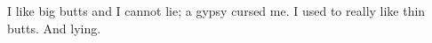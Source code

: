 \item I like big butts and I cannot lie; a gypsy cursed me. I used to
  really like thin butts. And lying.